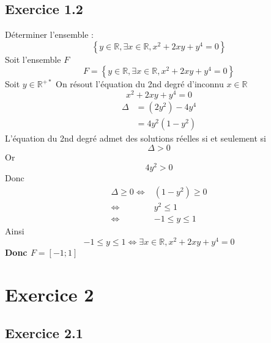 \documentclass[a4paper,12pt]{article}
\begin{document}
\subsection{Exercice 1.2}
Déterminer l'ensemble :
\[
 \left\{ y \in \mathbb{R}, \exists x \in \mathbb{R}, x^2 + 2xy + y^4 = 0 \right\}
\]
Soit l'ensemble $F$
\[
F = \left\{ y \in \mathbb{R}, \exists x \in \mathbb{R}, x^2 + 2xy + y^4 = 0 \right\}
\]
Soit $y \in \mathbb{R}^{+*}$
On résout l'équation du 2nd degré d’inconnu $x \in \mathbb{R}$
\[
x^2 + 2xy + y^4 = 0
\]
\[
\begin{aligned}
\Delta &= (2y^2) - 4y^4\\
&= 4y^2 (1 - y^2)
\end{aligned}
\]
L'équation du 2nd degré admet des solutions réelles si et seulement si 
\[
\Delta > 0
\]
Or
\[
4y^2 > 0
\]
Donc 
\[
\begin{aligned}
\Delta \ge 0  \Leftrightarrow & (1-y^2) \ge 0\\
\Leftrightarrow& y^2 \le 1\\
\Leftrightarrow& -1 \le y \le 1
\end{aligned}
\]
Ainsi
\[
-1 \le y \le 1 \Leftrightarrow \exists x \in \mathbb{R}, x^2 + 2xy + y^4 = 0
\]
\textbf{Donc $F = [-1 ; 1]$}
\section{Exercice 2}
\subsection{Exercice 2.1}
\end{document}
